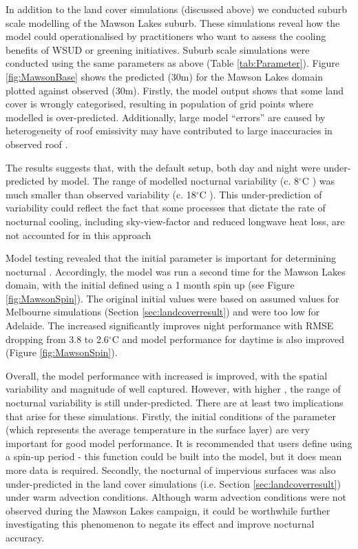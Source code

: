 \documentclass[final,3p,times,authoryear]{elsarticle}
\newcommand{\degreeC}{\ensuremath{^\circ}C }
\begin{document}
In addition to the land cover simulations (discussed above) we conducted suburb scale modelling of the Mawson Lakes suburb. These simulations reveal how the  model could operationalised by practitioners who want to assess the cooling benefits of WSUD or greening initiatives. Suburb scale simulations were conducted using the same parameters as above (Table \ref{tab:Parameter}). Figure \ref{fig:MawsonBase} shows the predicted  (30m) for the Mawson Lakes domain plotted against observed  (30m). Firstly, the model output shows that some land cover is wrongly categorised, resulting in population of grid points where modelled  is over-predicted. Additionally, large model “errors” are caused by heterogeneity of roof emissivity may have contributed to large inaccuracies in observed roof . 

The results suggests that, with the default setup, both day and night  were under-predicted by model. The range of modelled nocturnal  variability (c. 8\degreeC) was much smaller than observed variability (c. 18\degreeC). This under-prediction of variability could reflect the fact that some processes that dictate the rate of nocturnal cooling, including sky-view-factor and reduced longwave heat loss, are not accounted for in this approach

Model testing revealed that the initial  parameter is important for determining nocturnal . Accordingly, the model was run a second time for the Mawson Lakes domain, with the initial  defined using a 1 month spin up (see Figure \ref{fig:MawsonSpin}). The original initial  values were based on assumed values for Melbourne simulations (Section \ref{sec:landcoverresult}) and were too low for Adelaide. The increased  significantly improves night  performance with RMSE dropping from 3.8 to 2.6\degreeC and model performance for daytime  is also improved (Figure \ref{fig:MawsonSpin}).

Overall, the model performance with increased  is improved, with the spatial variability and magnitude of  well captured. However, with higher , the range of nocturnal  variability is still under-predicted.  There are at least two implications that arise for these simulations. Firstly, the initial conditions of the  parameter (which represents the average temperature in the surface layer) are very important for good model performance. It is recommended that users define  using a spin-up period - this function could be built into the model, but it does mean more data is required.  Secondly, the nocturnal  of impervious surfaces was also under-predicted in the land cover simulations (i.e. Section \ref{sec:landcoverresult}) under warm advection conditions. Although warm advection conditions were not observed during the Mawson Lakes campaign, it could be worthwhile further investigating this phenomenon to negate its effect and improve nocturnal  accuracy. 
\end{document}
